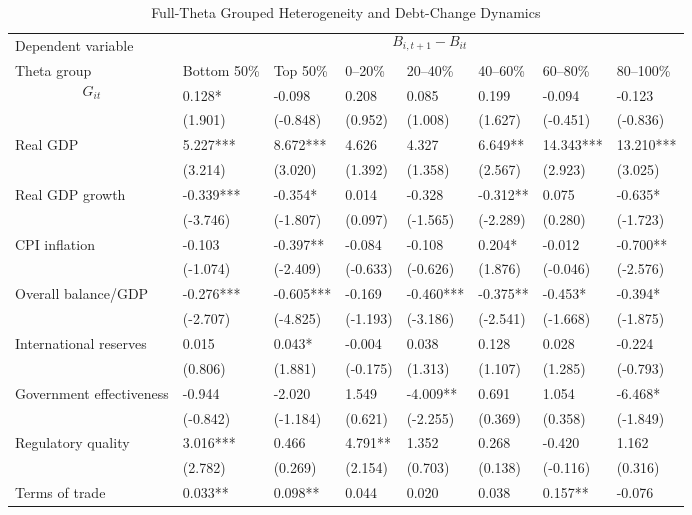 \begin{table}[H]\centering
\begin{threeparttable}
\caption{Full-Theta Grouped Heterogeneity and Debt-Change Dynamics}
\label{tab:theta_group_heterogeneity_debt}
\scriptsize
\begin{tabularx}{\textwidth}{lYYYYYYY}
\toprule
Dependent variable &  \\
\cmidrule(lr){2-8}
Theta group & Bottom 50\% & Top 50\% & 0--20\% & 20--40\% & 40--60\% & 60--80\% & 80--100\% \\
\midrule
$$G_{it}$$ & 0.128* & -0.098 & 0.208 & 0.085 & 0.199 & -0.094 & -0.123 \\
  & (1.901) & (-0.848) & (0.952) & (1.008) & (1.627) & (-0.451) & (-0.836) \\
Real GDP & 5.227*** & 8.672*** & 4.626 & 4.327 & 6.649** & 14.343*** & 13.210*** \\
  & (3.214) & (3.020) & (1.392) & (1.358) & (2.567) & (2.923) & (3.025) \\
Real GDP growth & -0.339*** & -0.354* & 0.014 & -0.328 & -0.312** & 0.075 & -0.635* \\
  & (-3.746) & (-1.807) & (0.097) & (-1.565) & (-2.289) & (0.280) & (-1.723) \\
CPI inflation & -0.103 & -0.397** & -0.084 & -0.108 & 0.204* & -0.012 & -0.700** \\
  & (-1.074) & (-2.409) & (-0.633) & (-0.626) & (1.876) & (-0.046) & (-2.576) \\
Overall balance/GDP & -0.276*** & -0.605*** & -0.169 & -0.460*** & -0.375** & -0.453* & -0.394* \\
  & (-2.707) & (-4.825) & (-1.193) & (-3.186) & (-2.541) & (-1.668) & (-1.875) \\
International reserves & 0.015 & 0.043* & -0.004 & 0.038 & 0.128 & 0.028 & -0.224 \\
  & (0.806) & (1.881) & (-0.175) & (1.313) & (1.107) & (1.285) & (-0.793) \\
Government effectiveness & -0.944 & -2.020 & 1.549 & -4.009** & 0.691 & 1.054 & -6.468* \\
  & (-0.842) & (-1.184) & (0.621) & (-2.255) & (0.369) & (0.358) & (-1.849) \\
Regulatory quality & 3.016*** & 0.466 & 4.791** & 1.352 & 0.268 & -0.420 & 1.162 \\
  & (2.782) & (0.269) & (2.154) & (0.703) & (0.138) & (-0.116) & (0.316) \\
Terms of trade & 0.033** & 0.098** & 0.044 & 0.020 & 0.038 & 0.157** & -0.076 \\

\end{tabularx}
\end{threeparttable}
\end{table}
